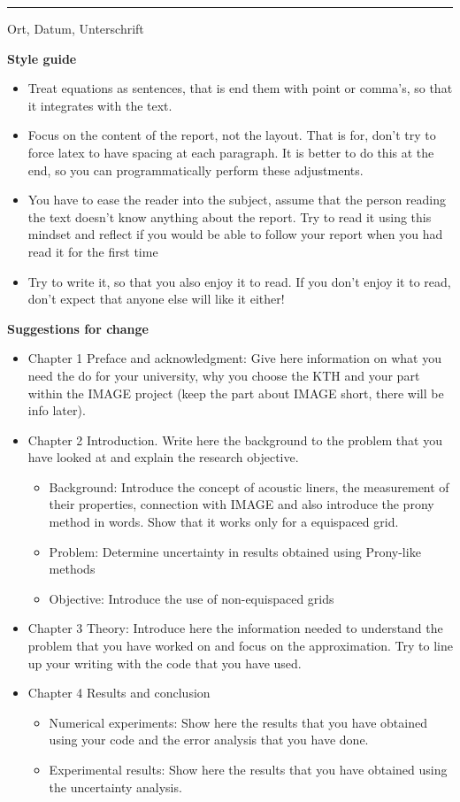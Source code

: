 \documentclass[11pt]{report} %
\newcommand{\Ort}{%
    Ort}
\newcommand{\Datum}{%
    Datum}
\begin{document}
\vspace{18.1mm}
\rule[-3.7mm]{\linewidth}{0.5pt}
\Ort{}, \Datum{}, Unterschrift


{\bf Style guide}
\begin{itemize}
\item Treat equations as sentences, that is end them with point or comma's, so that it integrates with the text.
\item Focus on the content of the report, not the layout. That is for, don't try to force latex to have spacing at each paragraph. It is better to do this at the end, so you can programmatically perform these adjustments.
\item You have to ease the reader into the subject, assume that the person reading the text doesn't know anything about the report. Try to read it using this mindset and reflect if you would be able to follow your report when you had read it for the first time
\item Try to write it, so that you also enjoy it to read. If you don't enjoy it to read, don't expect that anyone else will like it either!
\end{itemize}
{\bf Suggestions for change}
\begin{itemize}
    \item Chapter 1 Preface and acknowledgment: Give here information on what you need the do for your university, why you choose the KTH and your part within the IMAGE project (keep the part about IMAGE short, there will be info later).
    \item Chapter 2 Introduction. Write here the background to the problem that you have looked at and explain the research objective.
        \begin{itemize}
            \item Background: Introduce the concept of acoustic liners, the measurement of their properties, connection with IMAGE and also introduce the prony method in words. Show that it works only for a equispaced grid. 
            \item Problem: Determine uncertainty in results obtained using Prony-like methods
            \item Objective: Introduce the use of non-equispaced grids
        \end{itemize}
    \item Chapter 3 Theory: Introduce here the information needed to understand the problem that you have worked on and focus on the approximation. Try to line up your writing with the code that you have used.
    \item Chapter 4 Results and conclusion
        \begin{itemize}
            \item Numerical experiments: Show here the results that you have obtained using your code and the error analysis that you have done.
            \item Experimental results: Show here the results that you have obtained using the uncertainty analysis.
        \end{itemize}
\end{itemize}
\end{document}
